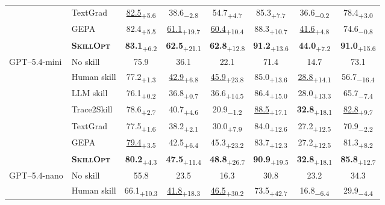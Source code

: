 \documentclass[
]{article}
\providecommand{\mrowcell}{}
\newcommand{\ourmethod}{\textsc{SkillOpt}\xspace}
\newcommand{\dvalp}[2]{\hphantom{\textsubscript{+#2}}#1\textsubscript{\textcolor{deltapos}{+#2}}}
\newcommand{\dvaln}[2]{\hphantom{\textsubscript{$-$#2}}#1\textsubscript{\textcolor{deltaneg}{$-$#2}}}
\newcommand{\methodcell}[1]{\cellcolor{blue!8}#1}
\begin{document}
\begin{table}[!htbp]
\begin{tabular}{l l c c c c c c}
\mrowcell & TextGrad & \dvalp{\underline{82.5}}{5.6} & \dvaln{38.6}{2.8} & \dvalp{54.7}{4.7} & \dvalp{85.3}{7.7} & \dvaln{36.6}{0.2} & \dvalp{78.4}{3.0} \\
\mrowcell & GEPA & \dvalp{82.4}{5.5} & \dvalp{\underline{61.1}}{19.7} & \dvalp{\underline{60.4}}{10.4} & \dvalp{88.3}{10.7} & \dvalp{\underline{41.6}}{4.8} & \dvaln{74.6}{0.8} \\
\mrowcell & \methodcell{\textbf{\ourmethod{}}} & \methodcell{\dvalp{\textbf{83.1}}{6.2}} & \methodcell{\dvalp{\textbf{62.5}}{21.1}} & \methodcell{\dvalp{\textbf{62.8}}{12.8}} & \methodcell{\dvalp{\textbf{91.2}}{13.6}} & \methodcell{\dvalp{\textbf{44.0}}{7.2}} & \methodcell{\dvalp{\textbf{91.0}}{15.6}} \\
\cmidrule(lr){1-8}
\multirow{7}{*}{GPT--5.4-mini} & No skill & 75.9 & 36.1 & 22.1 & 71.4 & 14.7 & 73.1 \\
\mrowcell & Human skill & \dvalp{77.2}{1.3} & \dvalp{\underline{42.9}}{6.8} & \dvalp{\underline{45.9}}{23.8} & \dvalp{85.0}{13.6} & \dvalp{\underline{28.8}}{14.1} & \dvaln{56.7}{16.4} \\
\mrowcell & LLM skill & \dvalp{76.1}{0.2} & \dvalp{36.8}{0.7} & \dvalp{36.6}{14.5} & \dvalp{86.4}{15.0} & \dvalp{28.0}{13.3} & \dvaln{65.7}{7.4} \\
\mrowcell & Trace2Skill & \dvalp{78.6}{2.7} & \dvalp{40.7}{4.6} & \dvaln{20.9}{1.2} & \dvalp{\underline{88.5}}{17.1} & \dvalp{\textbf{32.8}}{18.1} & \dvalp{\underline{82.8}}{9.7} \\
\mrowcell & TextGrad & \dvalp{77.5}{1.6} & \dvalp{38.2}{2.1} & \dvalp{30.0}{7.9} & \dvalp{84.0}{12.6} & \dvalp{27.2}{12.5} & \dvaln{70.9}{2.2} \\
\mrowcell & GEPA & \dvalp{\underline{79.4}}{3.5} & \dvalp{42.5}{6.4} & \dvalp{45.3}{23.2} & \dvalp{83.7}{12.3} & \dvalp{27.2}{12.5} & \dvalp{81.3}{8.2} \\
\mrowcell & \methodcell{\textbf{\ourmethod{}}} & \methodcell{\dvalp{\textbf{80.2}}{4.3}} & \methodcell{\dvalp{\textbf{47.5}}{11.4}} & \methodcell{\dvalp{\textbf{48.8}}{26.7}} & \methodcell{\dvalp{\textbf{90.9}}{19.5}} & \methodcell{\dvalp{\textbf{32.8}}{18.1}} & \methodcell{\dvalp{\textbf{85.8}}{12.7}} \\
\cmidrule(lr){1-8}
\multirow{7}{*}{GPT--5.4-nano} & No skill & 55.8 & 23.5 & 16.3 & 30.8 & 23.2 & 34.3 \\
\mrowcell & Human skill & \dvalp{66.1}{10.3} & \dvalp{\underline{41.8}}{18.3} & \dvalp{\underline{46.5}}{30.2} & \dvalp{73.5}{42.7} & \dvaln{16.8}{6.4} & \dvaln{29.9}{4.4} \\

\end{tabular}
\end{table}
\end{document}
